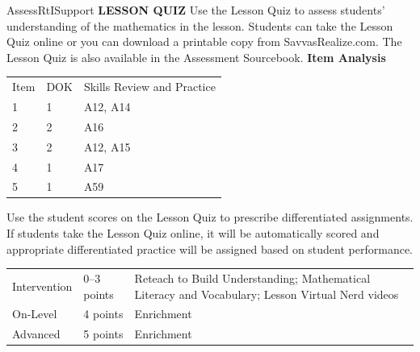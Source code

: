 \documentclass{article}
\newenvironment{te-addendum}[2]{}{}     %
\begin{document}
\begin{te-addendum}{Assess}{RtISupport}
\textbf{LESSON QUIZ}
Use the Lesson Quiz to assess students' understanding of the mathematics in the lesson.
Students can take the Lesson Quiz online or you can download a printable copy from SavvasRealize.com. The Lesson Quiz is also available in the Assessment Sourcebook.
\textbf{Item Analysis}
\begin{tabular}{lll}
Item & DOK & Skills Review and Practice \\
1 & 1 & A12, A14 \\
2 & 2 & A16 \\
3 & 2 & A12, A15 \\
4 & 1 & A17 \\
5 & 1 & A59 \\
\end{tabular}
Use the student scores on the Lesson Quiz to prescribe differentiated assignments.
If students take the Lesson Quiz online, it will be automatically scored and appropriate differentiated practice will be assigned based on student performance.
\begin{tabular}{lll}
Intervention & 0--3 points & Reteach to Build Understanding; Mathematical Literacy and Vocabulary; Lesson Virtual Nerd videos \\
On-Level & 4 points & Enrichment \\
Advanced & 5 points & Enrichment \\
\end{tabular}
\end{te-addendum}
\end{document}
